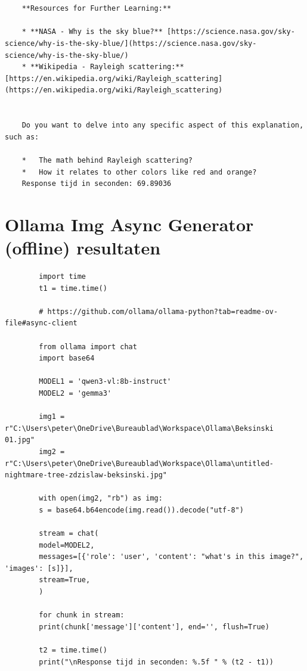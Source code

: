 \begin{verbatim}
    
    
    **Resources for Further Learning:**
    
    * **NASA - Why is the sky blue?** [https://science.nasa.gov/sky-science/why-is-the-sky-blue/](https://science.nasa.gov/sky-science/why-is-the-sky-blue/)
    * **Wikipedia - Rayleigh scattering:** [https://en.wikipedia.org/wiki/Rayleigh_scattering](https://en.wikipedia.org/wiki/Rayleigh_scattering)
    
    
    Do you want to delve into any specific aspect of this explanation, such as:
    
    *   The math behind Rayleigh scattering?
    *   How it relates to other colors like red and orange?
    Response tijd in seconden: 69.89036
\end{verbatim}

\section{Ollama Img Async Generator (offline) resultaten}
\label{sec:ollamaimgasyncgeneratorofflineresultaten}

\begin{listing}
    \begin{verbatim}
        import time
        t1 = time.time()
        
        # https://github.com/ollama/ollama-python?tab=readme-ov-file#async-client
        
        from ollama import chat
        import base64
        
        MODEL1 = 'qwen3-vl:8b-instruct'
        MODEL2 = 'gemma3'
        
        img1 = r"C:\Users\peter\OneDrive\Bureaublad\Workspace\Ollama\Beksinski 01.jpg"
        img2 = r"C:\Users\peter\OneDrive\Bureaublad\Workspace\Ollama\untitled-nightmare-tree-zdzislaw-beksinski.jpg"
        
        with open(img2, "rb") as img:
        s = base64.b64encode(img.read()).decode("utf-8")
        
        stream = chat(
        model=MODEL2,
        messages=[{'role': 'user', 'content': "what's in this image?", 'images': [s]}],
        stream=True,
        )
        
        for chunk in stream:
        print(chunk['message']['content'], end='', flush=True)
        
        t2 = time.time()
        print("\nResponse tijd in seconden: %.5f " % (t2 - t1))
    \end{verbatim}
    \caption[Ollama Img Async Generator Code]{Code om te communiceren met \textit{gemma3:4b}.}
    \label{lst:ollama-img-async-generator-test}
\end{listing}

